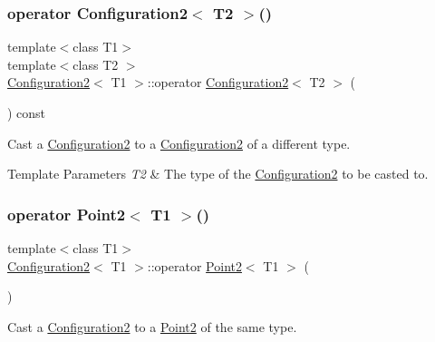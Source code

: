 \subsubsection{\texorpdfstring{operator Configuration2$<$ T2 $>$()}{operator Configuration2< T2 >()}}
{\footnotesize\ttfamily template$<$class T1$>$ \\
template$<$class T2 $>$ \\
\mbox{\hyperlink{class_configuration2}{Configuration2}}$<$ T1 $>$\+::operator \mbox{\hyperlink{class_configuration2}{Configuration2}}$<$ T2 $>$ (\begin{DoxyParamCaption}{ }\end{DoxyParamCaption}) const\hspace{0.3cm}{\ttfamily [inline]}}



Cast a {\ttfamily \mbox{\hyperlink{class_configuration2}{Configuration2}}} to a {\ttfamily \mbox{\hyperlink{class_configuration2}{Configuration2}}} of a different type. 


\begin{DoxyTemplParams}{Template Parameters}
{\em T2} & The type of the {\ttfamily \mbox{\hyperlink{class_configuration2}{Configuration2}}} to be casted to. \\
\hline
\end{DoxyTemplParams}
\mbox{\label{class_configuration2_a8f9c571c4438c591dbafbd76eda85a0e}} 
\subsubsection{\texorpdfstring{operator Point2$<$ T1 $>$()}{operator Point2< T1 >()}}
{\footnotesize\ttfamily template$<$class T1$>$ \\
\mbox{\hyperlink{class_configuration2}{Configuration2}}$<$ T1 $>$\+::operator \mbox{\hyperlink{class_point2}{Point2}}$<$ T1 $>$ (\begin{DoxyParamCaption}{ }\end{DoxyParamCaption})\hspace{0.3cm}{\ttfamily [inline]}}



Cast a {\ttfamily \mbox{\hyperlink{class_configuration2}{Configuration2}}} to a {\ttfamily \mbox{\hyperlink{class_point2}{Point2}}} of the same type. 

